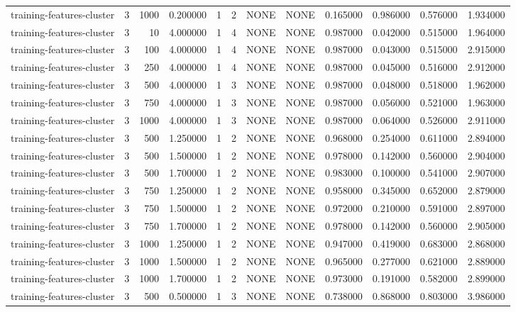 \begin{tabular}{lrrrllllrrrr}
training-features-cluster & 3 & 1000 & 0.200000 & 1 & 2 & NONE & NONE & 0.165000 & 0.986000 & 0.576000 & 1.934000 \\
training-features-cluster & 3 & 10 & 4.000000 & 1 & 4 & NONE & NONE & 0.987000 & 0.042000 & 0.515000 & 1.964000 \\
training-features-cluster & 3 & 100 & 4.000000 & 1 & 4 & NONE & NONE & 0.987000 & 0.043000 & 0.515000 & 2.915000 \\
training-features-cluster & 3 & 250 & 4.000000 & 1 & 4 & NONE & NONE & 0.987000 & 0.045000 & 0.516000 & 2.912000 \\
training-features-cluster & 3 & 500 & 4.000000 & 1 & 3 & NONE & NONE & 0.987000 & 0.048000 & 0.518000 & 1.962000 \\
training-features-cluster & 3 & 750 & 4.000000 & 1 & 3 & NONE & NONE & 0.987000 & 0.056000 & 0.521000 & 1.963000 \\
training-features-cluster & 3 & 1000 & 4.000000 & 1 & 3 & NONE & NONE & 0.987000 & 0.064000 & 0.526000 & 2.911000 \\
training-features-cluster & 3 & 500 & 1.250000 & 1 & 2 & NONE & NONE & 0.968000 & 0.254000 & 0.611000 & 2.894000 \\
training-features-cluster & 3 & 500 & 1.500000 & 1 & 2 & NONE & NONE & 0.978000 & 0.142000 & 0.560000 & 2.904000 \\
training-features-cluster & 3 & 500 & 1.700000 & 1 & 2 & NONE & NONE & 0.983000 & 0.100000 & 0.541000 & 2.907000 \\
training-features-cluster & 3 & 750 & 1.250000 & 1 & 2 & NONE & NONE & 0.958000 & 0.345000 & 0.652000 & 2.879000 \\
training-features-cluster & 3 & 750 & 1.500000 & 1 & 2 & NONE & NONE & 0.972000 & 0.210000 & 0.591000 & 2.897000 \\
training-features-cluster & 3 & 750 & 1.700000 & 1 & 2 & NONE & NONE & 0.978000 & 0.142000 & 0.560000 & 2.905000 \\
training-features-cluster & 3 & 1000 & 1.250000 & 1 & 2 & NONE & NONE & 0.947000 & 0.419000 & 0.683000 & 2.868000 \\
training-features-cluster & 3 & 1000 & 1.500000 & 1 & 2 & NONE & NONE & 0.965000 & 0.277000 & 0.621000 & 2.889000 \\
training-features-cluster & 3 & 1000 & 1.700000 & 1 & 2 & NONE & NONE & 0.973000 & 0.191000 & 0.582000 & 2.899000 \\
training-features-cluster & 3 & 500 & 0.500000 & 1 & 3 & NONE & NONE & 0.738000 & 0.868000 & 0.803000 & 3.986000 \\

\end{tabular}
